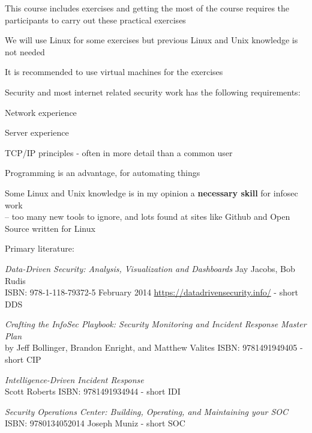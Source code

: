 \documentclass[Screen16to9,17pt]{foils}
\begin{document}

\begin{list1}
\item This course includes exercises and getting the most of the course requires the participants to carry out these practical exercises
\item We will use Linux for some exercises but previous Linux and Unix knowledge is not needed
\item It is recommended to use virtual machines for the exercises
\item Security and most internet related security work has the following requirements:
\begin{list2}
\item Network experience
\item Server experience
\item TCP/IP principles - often in more detail than a common user
\item Programming is an advantage, for automating things
\item Some Linux and Unix knowledge is in my opinion a {\bf necessary skill} for infosec work\\
-- too many new tools to ignore, and lots found at sites like Github and Open Source written for Linux
\end{list2}
\end{list1}



Primary literature:
\begin{list2}
\item \emph{Data-Driven Security: Analysis, Visualization and Dashboards} Jay Jacobs, Bob Rudis\\
ISBN: 978-1-118-79372-5 February 2014 \url{https://datadrivensecurity.info/} - short DDS
\item \emph{Crafting the InfoSec Playbook: Security Monitoring and Incident Response Master Plan}\\
 by Jeff Bollinger, Brandon Enright, and Matthew Valites ISBN: 9781491949405 - short CIP
\item \emph{Intelligence-Driven Incident Response} \\
 Scott Roberts ISBN: 9781491934944 - short IDI
\item \emph{Security Operations Center: Building, Operating, and Maintaining your SOC}\\
ISBN: 9780134052014 Joseph Muniz - short SOC
\end{list2}
\end{document}
